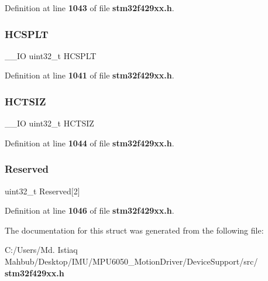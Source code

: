 Definition at line \textbf{ 1043} of file \textbf{ stm32f429xx.\+h}.

\mbox{\label{structUSB__OTG__HostChannelTypeDef_ad715951248900b9a7c8c9ddb688bb3a0}} 
\subsubsection{H\+C\+S\+P\+LT}
{\footnotesize\ttfamily \+\_\+\+\_\+\+IO uint32\+\_\+t H\+C\+S\+P\+LT}



Definition at line \textbf{ 1041} of file \textbf{ stm32f429xx.\+h}.

\mbox{\label{structUSB__OTG__HostChannelTypeDef_adde42c516172a887c570545d965200cf}} 
\subsubsection{H\+C\+T\+S\+IZ}
{\footnotesize\ttfamily \+\_\+\+\_\+\+IO uint32\+\_\+t H\+C\+T\+S\+IZ}



Definition at line \textbf{ 1044} of file \textbf{ stm32f429xx.\+h}.

\mbox{\label{structUSB__OTG__HostChannelTypeDef_ae930d94b6a3272fed7c42c1a02929924}} 
\subsubsection{Reserved}
{\footnotesize\ttfamily uint32\+\_\+t Reserved[2]}



Definition at line \textbf{ 1046} of file \textbf{ stm32f429xx.\+h}.



The documentation for this struct was generated from the following file\+:\begin{DoxyCompactItemize}
\item 
C\+:/\+Users/\+Md. Istiaq Mahbub/\+Desktop/\+I\+M\+U/\+M\+P\+U6050\+\_\+\+Motion\+Driver/\+Device\+Support/src/\textbf{ stm32f429xx.\+h}\end{DoxyCompactItemize}
